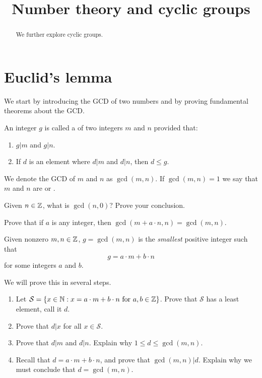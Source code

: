\documentclass{ximera}
\title{Number theory and cyclic groups}
\begin{document}
\begin{abstract}
  We further explore cyclic groups.
\end{abstract}
\maketitle


\section{Euclid's lemma}

We start by introducing the GCD of two numbers and by proving
fundamental theorems about the GCD.


\begin{definition}
An integer $g$ is called a  of two
integers $m$ and $n$ provided that:
\begin{enumerate}
\item $g| m$ and $g | n$.
\item If $d$ is an element where $d| m$ and $d | n$, then $d\le g$.
\end{enumerate}
We denote the GCD of $m$ and $n$ as $\gcd(m,n)$. If $\gcd(m,n) = 1$ we
say that $m$ and $n$ are  or .
\end{definition}


\begin{exercise} 
Given $n\in \mathbb Z$, what is $\gcd(n,0)$? Prove your conclusion.
\end{exercise}

\begin{exercise} 
Prove that if $a$ is any integer, then $\gcd(m + a\cdot n, n) =
\gcd(m, n)$.
\end{exercise}




\begin{theorem}\label{T:EL1}
  Given nonzero $m,n\in\mathbb Z$, $g=\gcd(m,n)$ is the \textit{smallest}
  positive integer such that
  \[
  g = a\cdot m +b\cdot n
  \]
  for some integers $a$ and $b$.
  \begin{sketch} We will prove this in several steps.
  \begin{enumerate}
  \item Let $\mathcal S = \{x\in \mathbb N: x = a\cdot m +b\cdot n\text{ for } a,b\in
    \mathbb Z\}$. Prove that $\mathcal S$ has a least element, call it $d$.
  \item Prove that $d| x$ for all $x\in \mathcal S$.
  \item Prove that $d| m$ and $d| n$. Explain why $1 \le d \le \gcd(m,n)$.
  \item Recall that $d = a\cdot m +b\cdot n$, and prove that $\gcd(m,n) |
    d$. Explain why we must conclude that $d = \gcd(m,n)$.
  \end{enumerate}
  \end{sketch}
\end{theorem}
\end{document}
